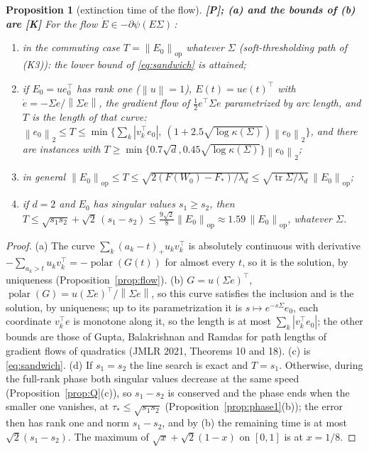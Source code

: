 \documentclass[11pt]{article}
\newtheorem{proposition}[theorem]{Proposition}
\theoremstyle{definition}
\theoremstyle{remark}
\newcommand{\norm}[1]{\left\|#1\right\|}
\newcommand{\nop}[1]{\left\|#1\right\|_{\mathrm{op}}}
\newcommand{\abs}[1]{\left|#1\right|}
\newcommand{\tr}{\operatorname{tr}}
\newcommand{\polar}{\operatorname{polar}}
\begin{document}
\begin{proposition}[extinction time of the flow]\label{prop:ext} \textbf{[P]; (a) and the bounds of (b) are [K]}
For the flow $\dot E\in-\partial\psi(E\Sigma)\,$:
\begin{enumerate}[label=(\alph*)]
\item in the commuting case $T=\nop{E_0}$ whatever $\Sigma$ (soft-thresholding path of (K3)): the lower bound of
\eqref{eq:sandwich} is attained;
\item if $E_0=ue_0^\top$ has rank one ($\norm u=1$), $E(t)=ue(t)^\top$ with $\dot e=-\Sigma e/\norm{\Sigma e}$, the
gradient flow of $\frac12e^\top\Sigma e$ parametrized by arc length, and $T$ is the length of that curve:
$\norm{e_0}_2\le T\le\min\{\sum_k\abs{v_k^\top e_0},\ (1+2.5\sqrt{\log\kappa(\Sigma)})\norm{e_0}_2\}$, and there are
instances with $T\ge\min\{0.7\sqrt d,0.45\sqrt{\log\kappa(\Sigma)}\}\norm{e_0}_2$;
\item in general $\nop{E_0}\le T\le\sqrt{2(F(W_0)-F_\ast)/\lambda_d}\le\sqrt{\tr\Sigma/\lambda_d}\,\nop{E_0}$;
\item if $d=2$ and $E_0$ has singular values $s_1\ge s_2$, then
$T\le\sqrt{s_1s_2}+\sqrt2\,(s_1-s_2)\le\frac{9\sqrt2}8\nop{E_0}\approx1.59\,\nop{E_0}$, whatever $\Sigma$.
\end{enumerate}
\end{proposition}
\begin{proof}
(a) The curve $\sum_k(a_k-t)_+u_kv_k^\top$ is absolutely continuous with derivative
$-\sum_{a_k>t}u_kv_k^\top=-\polar(G(t))$ for almost every $t$, so it is the solution, by uniqueness
(Proposition~\ref{prop:flow}). (b) $G=u(\Sigma e)^\top$, $\polar(G)=u(\Sigma e)^\top/\norm{\Sigma e}$, so this curve
satisfies the inclusion and is the solution, by uniqueness; up to its parametrization it is
$s\mapsto e^{-s\Sigma}e_0$, each coordinate $v_k^\top e$ is monotone along it, so the length is at most
$\sum_k\abs{v_k^\top e_0}$; the other bounds are those of Gupta, Balakrishnan and Ramdas for path lengths of gradient
flows of quadratics (JMLR 2021, Theorems 10 and 18). (c) is \eqref{eq:sandwich}. (d) If $s_1=s_2$ the line search is
exact and $T=s_1$. Otherwise, during the full-rank phase both singular values decrease at the same speed
(Proposition~\ref{prop:Q}(c)), so $s_1-s_2$ is conserved and the phase ends when the smaller one vanishes, at
$\tau_\ast\le\sqrt{s_1s_2}$ (Proposition~\ref{prop:phase1}(b)); the error then has rank one and norm $s_1-s_2$, and by
(b) the remaining time is at most $\sqrt2(s_1-s_2)$. The maximum of $\sqrt x+\sqrt2(1-x)$ on $[0,1]$ is at $x=1/8$.
\end{proof}
\end{document}
